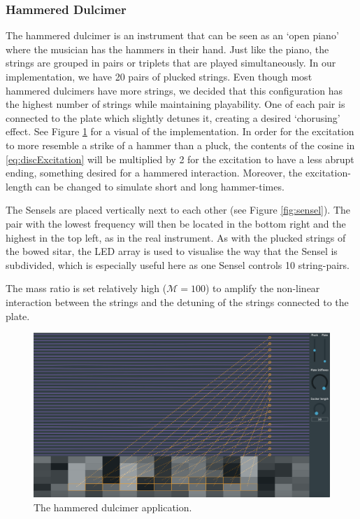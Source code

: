 \documentclass{article}
\begin{document}
\subsubsection{Hammered Dulcimer}
The hammered dulcimer is an instrument that can be seen as an `open piano' where the musician has the hammers in their hand. Just like the piano, the strings are grouped in pairs or triplets
that are played simultaneously. 
In our implementation, we have 20 pairs of plucked strings. Even though most hammered dulcimers have more strings, we decided that this configuration has the highest number of strings while maintaining playability. One of each pair is connected to the plate which slightly detunes it, creating a desired `chorusing' effect. See Figure \ref{fig:dulcimer} for a visual of the implementation. In order for the excitation to more resemble a strike of a hammer than a pluck, the contents of the cosine in \eqref{eq:discExcitation} will be multiplied by 2 for the excitation to have a less abrupt ending, something desired for a hammered interaction. Moreover, the excitation-length can be changed to simulate short and long hammer-times.

The Sensels are placed vertically next to each other (see Figure \ref{fig:sensel}). The pair with the lowest frequency will then be located in the bottom right and the highest in the top left, as in the real instrument. As with the plucked strings of the bowed sitar, the LED array is used to visualise the way that the Sensel is subdivided, which is especially useful here as one Sensel controls 10 string-pairs. 

The mass ratio is set relatively high ($\mathcal{M} = 100$) to amplify the non-linear interaction between the strings and the detuning of the strings connected to the plate. 

\begin{figure}[h]
\centering
\includegraphics[width=1.0\columnwidth]{dulcimer.png}
\caption{The hammered dulcimer application. \label{fig:dulcimer}}
\end{figure}
\end{document}
